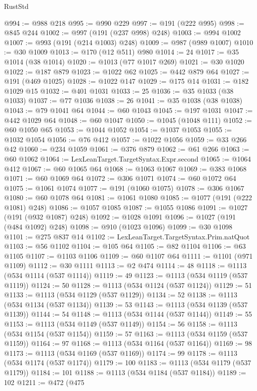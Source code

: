 \begin{lexlean}{RustStd}
\begin{coremodule}
{\begin{coremodule}
{{{{{{{{{{{{{{{{{{{{{{{{{{{{{{{{@994 := @988 @218
@995 := @990 @229
@997 := @191 (@222 @995)
@998 := @845 @244
@1002 := @997 (@191 (@237 @998) @248)
@1003 := @994 @1002
@1007 := @993 (@191 (@214 @1003) @248)
@1009 := @987 (@989 @1007)
@1010 := @30 @1009
@1013 := @170 (@12 @511) @980
@1014 := 24
@1017 := @35 @1014 (@38 @1014)
@1020 := @1013 (@77 @1017 @269)
@1021 := @30 @1020
@1022 := @187 @879
@1023 := @1022 @62
@1025 := @442 @879 @64
@1027 := @191 (@469 @1025)
@1028 := @1022 @147
@1029 := @175 @14
@1031 := @182 @1029 @15
@1032 := @401 @1031
@1033 := 25
@1036 := @35 @1033 (@38 @1033)
@1037 := @77 @1036
@1038 := 26
@1041 := @35 @1038 (@38 @1038)
@1043 := @79 @1041 @64
@1044 := @60 @1043
@1045 := @197 @1031
@1047 := @442 @1029 @64
@1048 := @60 @1047
@1050 := @1045 (@1048 @111)
@1052 := @60 @1050 @65
@1053 := @1044 @1052
@1054 := @1037 @1053
@1055 := @1032 @1054
@1056 := @76 @412
@1057 := @1022 @1056
@1059 := @33 @266 @42
@1060 := @234 @1059
@1061 := @376 @879
@1062 := @61 @266
@1063 := @60 @1062
@1064 := LexLeanTarget.TargetSyntax.Expr.second
@1065 := @1064 @412
@1067 := @60 @1065 @64
@1068 := @1063 @1067
@1069 := @383 @1068
@1071 := @60 @1069 @64
@1072 := @306 @1071
@1074 := @60 @1072 @64
@1075 := @1061 @1074
@1077 := @191 (@1060 @1075)
@1078 := @306 @1067
@1080 := @60 @1078 @64
@1081 := @1061 @1080
@1085 := @1077 (@191 (@222 @1081) @248)
@1086 := @1057 @1085
@1087 := @1055 @1086
@1091 := @1027 (@191 (@932 @1087) @248)
@1092 := @1028 @1091
@1096 := @1027 (@191 (@484 @1092) @248)
@1098 := @910 (@1023 @1096)
@1099 := @30 @1098
@1101 := @275 @837 @14
@1102 := LexLeanTarget.TargetSyntax.Prim.natQuot
@1103 := @56 @1102
@1104 := @105 @64
@1105 := @82 @1104
@1106 := @63 @1105
@1107 := @1103 @1106
@1109 := @60 @1107 @64
@1111 := @1101 (@971 @1109)
@1112 := @30 @1111
@1113 := @2 @474
@1114 := 48
@1118 := @1113 (@534 @1114 (@537 @1114))
@1119 := 49
@1123 := @1113 (@534 @1119 (@537 @1119))
@1124 := 50
@1128 := @1113 (@534 @1124 (@537 @1124))
@1129 := 51
@1133 := @1113 (@534 @1129 (@537 @1129))
@1134 := 52
@1138 := @1113 (@534 @1134 (@537 @1134))
@1139 := 53
@1143 := @1113 (@534 @1139 (@537 @1139))
@1144 := 54
@1148 := @1113 (@534 @1144 (@537 @1144))
@1149 := 55
@1153 := @1113 (@534 @1149 (@537 @1149))
@1154 := 56
@1158 := @1113 (@534 @1154 (@537 @1154))
@1159 := 57
@1163 := @1113 (@534 @1159 (@537 @1159))
@1164 := 97
@1168 := @1113 (@534 @1164 (@537 @1164))
@1169 := 98
@1173 := @1113 (@534 @1169 (@537 @1169))
@1174 := 99
@1178 := @1113 (@534 @1174 (@537 @1174))
@1179 := 100
@1183 := @1113 (@534 @1179 (@537 @1179))
@1184 := 101
@1188 := @1113 (@534 @1184 (@537 @1184))
@1189 := 102
@1211 := @472
    (@475
}}}}}}}}}}}}}}}}}}}}}}}}}}}}}}}}
\end{coremodule}}
\end{coremodule}
\end{lexlean}
